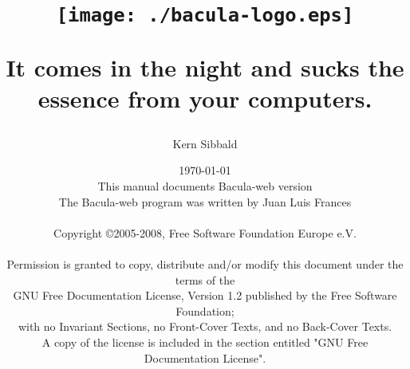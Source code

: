 \documentclass[11pt,a4paper]{report}
\begin{document}
\sloppy

\parskip 10pt
\parindent 0pt

\title{\texttt{[image: ./bacula-logo.eps]} \\ \bigskip
  \begin{center}
   \large{It comes in the night and sucks 
          the essence from your computers. }
  \end{center}
}

\author{Kern Sibbald}
\date{\vspace{1.0in}\today \\
      This manual documents Bacula-web version  \\
      The Bacula-web program was written by Juan Luis Frances\\
      \vspace{0.2in}\\
      Copyright \copyright 2005-2008, Free Software Foundation Europe e.V.
      \\
      \vspace{0.2in}\\
  Permission is granted to copy, distribute and/or modify this document under the terms of the \\
  GNU Free Documentation License, Version 1.2 published by the Free Software Foundation; \\ 
  with no Invariant Sections, no Front-Cover Texts, and no Back-Cover Texts. \\
  A copy of the license is included in the section entitled "GNU Free Documentation License".
}

\maketitle

\clearpage
\tableofcontents
\clearpage
\listoffigures
\clearpage
\listoftables
\clearpage





\clearpage
\printindex
\end{document}

